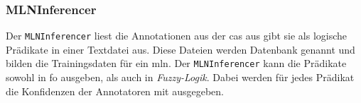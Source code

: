 \subsubsection{MLNInferencer}
Der \texttt{MLNInferencer} liest die Annotationen aus der \gls{cas} aus gibt sie als logische Prädikate in einer Textdatei aus. Diese Dateien werden Datenbank genannt und bilden die Trainingsdaten für ein \gls{mln}. Der \texttt{MLNInferencer} kann die Prädikate sowohl in \gls{fo} ausgeben, als auch in \textit{Fuzzy-Logik}. Dabei werden für jedes Prädikat die Konfidenzen der Annotatoren mit ausgegeben.
